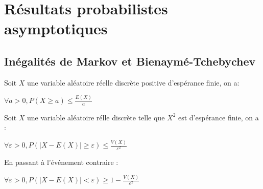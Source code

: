 \documentclass[a4paper,12pt]{book}
\newcommand{\Thr}[2]{\begin{tcolorbox}[sharp corners, colback=white,colframe=red!90!black!75, title=Théorème : #1]#2\end{tcolorbox}}
\begin{document}
\section{Résultats probabilistes asymptotiques}
\subsection{Inégalités de Markov et Bienaymé-Tchebychev}
\Thr{Inégalité de Markov}{Soit $X$ une variable aléatoire réelle discrète positive d'espérance finie, on a:
\par\begin{center}$\forall a>0, P(X\geq a)\leq \frac{E(X)}{a}$\end{center}}

\Thr{Inégalité de Bieinaymé-Tchebychev}{Soit $X$ une variable aléatoire rélle discrète telle que $X^2$ est d'espérance finie, on a :
\par\begin{center}$\forall \varepsilon>0, P(\vert X-E(X)\vert\geq \varepsilon)\leq \frac{V(X)}{\varepsilon^2}$\end{center}
\par En passant à l'événement contraire :
\par\begin{center}$\forall\varepsilon>0, P(\vert X-E(X)\vert<\varepsilon)\geq 1 - \frac{V(X)}{\varepsilon^2}$\end{center}}
\end{document}
